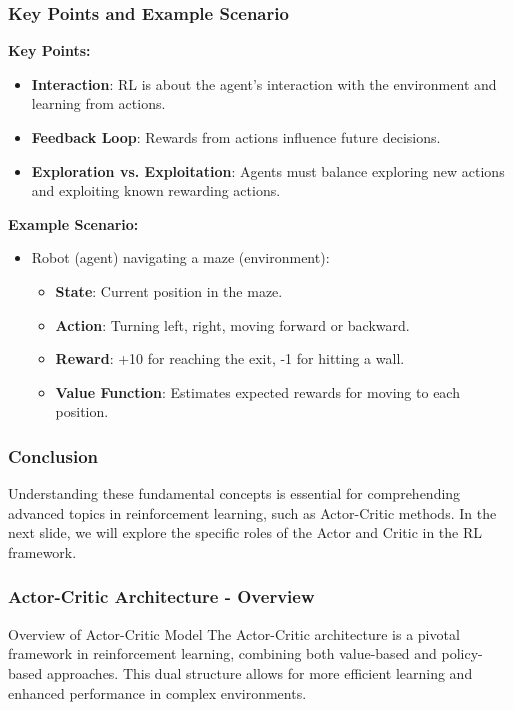 \documentclass{beamer}
\begin{document}
\begin{frame}[fragile]
    \frametitle{Key Points and Example Scenario}
    \textbf{Key Points:}
    \begin{itemize}
        \item \textbf{Interaction}: RL is about the agent's interaction with the environment and learning from actions.
        \item \textbf{Feedback Loop}: Rewards from actions influence future decisions.
        \item \textbf{Exploration vs. Exploitation}: Agents must balance exploring new actions and exploiting known rewarding actions.
    \end{itemize}
    
    \textbf{Example Scenario:}
    \begin{itemize}
        \item Robot (agent) navigating a maze (environment):
        \begin{itemize}
            \item \textbf{State}: Current position in the maze.
            \item \textbf{Action}: Turning left, right, moving forward or backward.
            \item \textbf{Reward}: +10 for reaching the exit, -1 for hitting a wall.
            \item \textbf{Value Function}: Estimates expected rewards for moving to each position.
        \end{itemize}
    \end{itemize}
\end{frame}

\begin{frame}[fragile]
    \frametitle{Conclusion}
    Understanding these fundamental concepts is essential for comprehending advanced topics in reinforcement learning, such as Actor-Critic methods. 
    In the next slide, we will explore the specific roles of the Actor and Critic in the RL framework.
\end{frame}

\begin{frame}[fragile]
    \frametitle{Actor-Critic Architecture - Overview}
    \begin{block}{Overview of Actor-Critic Model}
        The Actor-Critic architecture is a pivotal framework in reinforcement learning, combining both value-based and policy-based approaches. This dual structure allows for more efficient learning and enhanced performance in complex environments.
    \end{block}
\end{frame}
\end{document}
